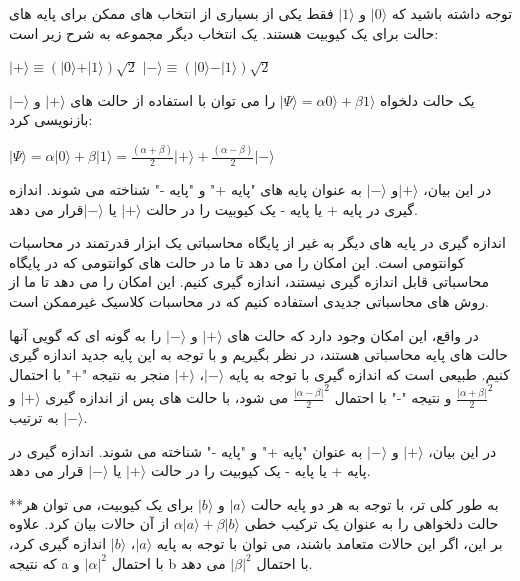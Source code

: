 \documentclass{book}
\begin{document}
توجه داشته باشید که $\vert 0 \rangle$ و $\vert 1 \rangle$ فقط یکی از بسیاری از انتخاب های ممکن برای پایه های حالت برای یک کیوبیت هستند. یک انتخاب دیگر مجموعه به شرح زیر است:
\begin{center}
$\vert+\rangle  \equiv (\vert0\rangle + \vert1\rangle)\sqrt{2}$
$\vert-\rangle \equiv  (\vert0\rangle - \vert1\rangle)\sqrt{2}$
\end{center}
 
 
 یک حالت دلخواه $\vert\Psi\rangle = \alpha0\rangle + \beta1\rangle$ را می توان با استفاده از حالت های $\vert + \rangle$ و $\vert - \rangle$ بازنویسی کرد:
\begin{center}
	$\vert\Psi\rangle = \alpha \vert0\rangle + \beta\vert1\rangle = \frac{(\alpha + \beta)}{2}\vert+\rangle + \frac{(\alpha - \beta)}{2}\vert-\rangle$
\end{center}


در این بیان، $\vert+\rangle$و $\vert-\rangle$ به عنوان پایه های "پایه +" و "پایه -" شناخته می شوند. اندازه گیری در پایه + یا پایه - یک کیوبیت را در حالت $\vert+\rangle$ یا $\vert-\rangle$قرار می دهد.
 

اندازه گیری در پایه های دیگر به غیر از پایگاه محاسباتی یک ابزار قدرتمند در محاسبات کوانتومی است. این امکان را می دهد تا ما در حالت های کوانتومی که در پایگاه محاسباتی قابل اندازه گیری نیستند، اندازه گیری کنیم. این امکان را می دهد تا ما از روش های محاسباتی جدیدی استفاده کنیم که در محاسبات کلاسیک غیرممکن است.

در واقع، این امکان وجود دارد که حالت های $\vert+\rangle$ و $\vert-\rangle$ را به گونه ای که گویی آنها حالت های پایه محاسباتی هستند، در نظر بگیریم و با توجه به این پایه جدید اندازه گیری کنیم. طبیعی است که اندازه گیری با توجه به پایه $\vert-\rangle$، $\vert+\rangle$ منجر به نتیجه "+" با احتمال $\frac{\vert\alpha + \beta\vert}{2}^2$ و نتیجه "-" با احتمال $\frac{\vert\alpha - \beta\vert}{2}^2$ می شود، با حالت های پس از اندازه گیری $\vert+\rangle$ و $\vert-\rangle$ به ترتیب.

در این بیان، $\vert+\rangle$ و $\vert-\rangle$ به عنوان "پایه +" و "پایه -" شناخته می شوند. اندازه گیری در پایه + یا پایه - یک کیوبیت را در حالت $\vert+\rangle$ یا $\vert-\rangle$ قرار می دهد.

**به طور کلی تر، با توجه به هر دو پایه حالت $\vert a\rangle$ و $\vert b\rangle$ برای یک کیوبیت، می توان هر حالت دلخواهی را به عنوان یک ترکیب خطی $\alpha \vert a\rangle + \beta \vert b\rangle$ از آن حالات بیان کرد. علاوه بر این، اگر این حالات  متعامد باشند، می توان با توجه به پایه $\vert a\rangle$، $\vert b\rangle$ اندازه گیری کرد، که نتیجه a با احتمال $\vert\alpha\vert ^2$ و b با احتمال $\vert\beta\vert ^2$ می دهد.
\end{document}
